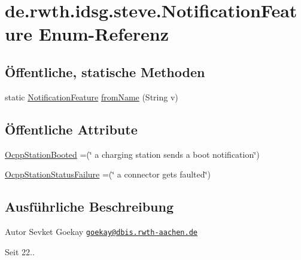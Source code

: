 \hypertarget{enumde_1_1rwth_1_1idsg_1_1steve_1_1_notification_feature}{\section{de.\+rwth.\+idsg.\+steve.\+Notification\+Feature Enum-\/\+Referenz}
\label{enumde_1_1rwth_1_1idsg_1_1steve_1_1_notification_feature}
}
\subsection*{Öffentliche, statische Methoden}
\begin{DoxyCompactItemize}
\item 
static \hyperlink{enumde_1_1rwth_1_1idsg_1_1steve_1_1_notification_feature}{Notification\+Feature} \hyperlink{enumde_1_1rwth_1_1idsg_1_1steve_1_1_notification_feature_a7a9d0c3d9f815bb178aab388d12b0b71}{from\+Name} (String v)
\end{DoxyCompactItemize}
\subsection*{Öffentliche Attribute}
\begin{DoxyCompactItemize}
\item 
\hyperlink{enumde_1_1rwth_1_1idsg_1_1steve_1_1_notification_feature_a3dd5693c79879d05167f2bc23d81acce}{Ocpp\+Station\+Booted} =(\char`\"{} a charging station sends a boot notification\char`\"{})
\item 
\hyperlink{enumde_1_1rwth_1_1idsg_1_1steve_1_1_notification_feature_a70aaa3d84c7d8acc92e81c9f37d3eb1d}{Ocpp\+Station\+Status\+Failure} =(\char`\"{} a connector gets faulted\char`\"{})
\end{DoxyCompactItemize}


\subsection{Ausführliche Beschreibung}
\begin{DoxyAuthor}{Autor}
Sevket Goekay \href{mailto:goekay@dbis.rwth-aachen.de}{\tt goekay@dbis.\+rwth-\/aachen.\+de} 
\end{DoxyAuthor}
\begin{DoxySince}{Seit}
22.. 
\end{DoxySince}



